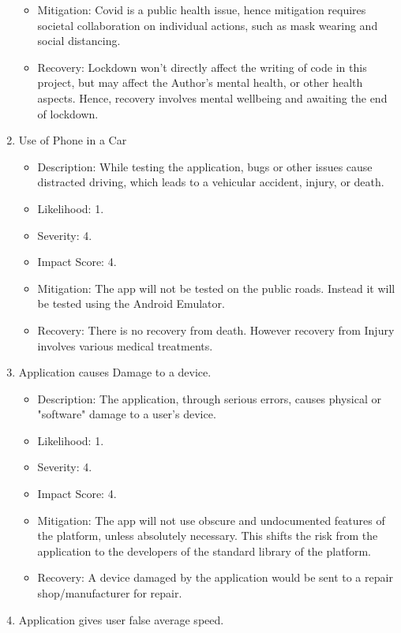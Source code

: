 \documentclass[11pt, a4paper, notitlepage]{report}
\begin{document}
\begin{enumerate}
\begin{itemize}
        \item Mitigation: Covid is a public health issue, hence mitigation requires societal collaboration on individual actions, such as mask wearing and social distancing.
        \item Recovery: Lockdown won't directly affect the writing of code in this project, but may affect the Author's mental health, or other health aspects. Hence, recovery involves mental wellbeing and awaiting the end of lockdown.
    \end{itemize}
    \item Use of Phone in a Car
    \begin{itemize}
        \item Description: While testing the application, bugs or other issues cause distracted driving, which leads to a vehicular accident, injury, or death.
        \item Likelihood: 1.
        \item Severity: 4.
        \item Impact Score: 4.
        \item Mitigation: The app will not be tested on the public roads. Instead it will be tested using the Android Emulator.
        \item Recovery: There is no recovery from death. However recovery from Injury involves various medical treatments.
    \end{itemize}
    \item Application causes Damage to a device.
    \begin{itemize}
        \item Description: The application, through serious errors, causes physical or "software" damage to a user's device.
        \item Likelihood: 1.
        \item Severity: 4.
        \item Impact Score: 4.
        \item Mitigation: The app will not use obscure and undocumented features of the platform, unless absolutely necessary. This shifts the risk from the application to the developers of the standard library of the platform.
        \item Recovery: A device damaged by the application would be sent to a repair shop/manufacturer for repair.
    \end{itemize}
    \item Application gives user false average speed.
    \begin{itemize}

\end{itemize}
\end{enumerate}
\end{document}
